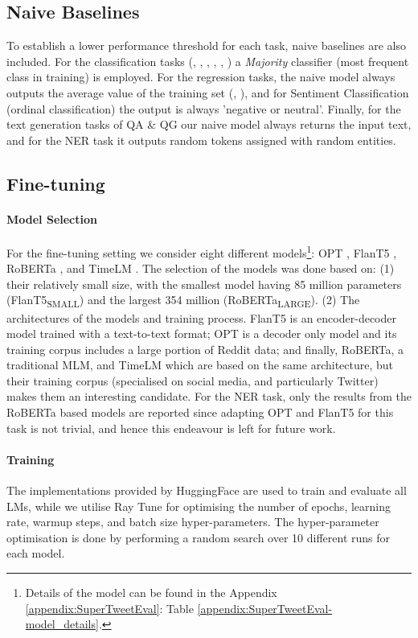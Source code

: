 \subsection{Naive Baselines}
To establish a lower performance threshold for each task, naive baselines are also included. For the classification tasks ({\TweetEmotion}, {\TweetNERD}, {\TempoWiC}, {\TweetTopic}, {\TweetHate}, {\TweetEmoji}) a \textit{Majority} classifier (most frequent class in training) is employed. For the regression tasks, the naive model always outputs the average value of the training set  ({\TweetIntimacy}, {\TweetSimilarity}), and for Sentiment Classification (ordinal classification) the output is always 'negative or neutral’. Finally, for the text generation tasks of QA \& QG our naive model always returns the input text, and for the NER task it outputs random tokens assigned with random entities.


\subsection{Fine-tuning}
\paragraph{Model Selection} For the fine-tuning setting we consider eight different models\footnote{Details of the model can be found in the Appendix \ref{appendix:SuperTweetEval}: Table \ref{appendix:SuperTweetEval-model_details}.}: OPT \cite{OPT}, FlanT5 \cite{chung2024scaling}, RoBERTa \cite{ROBERTA}, and TimeLM \cite{loureiro-etal-2022-timelms}. The selection of the models was done based on: (1) their relatively small size, with the smallest model having 85 million parameters (FlanT5\textsubscript{SMALL}) and the largest 354 million (RoBERTa\textsubscript{LARGE}). (2) The architectures of the models and training process. FlanT5 is an encoder-decoder model trained with a text-to-text format; OPT is a decoder only model and its training corpus includes a large portion of Reddit data; and finally, RoBERTa, a traditional \ac{MLM}, and TimeLM which are based on the same architecture, but their training corpus (specialised on social media, and particularly Twitter) makes them an interesting candidate. For the NER task, only the results from the RoBERTa based models are reported since adapting OPT and FlanT5 for this task is not trivial, and hence this endeavour is left for future work.

\paragraph{Training}  The implementations provided by HuggingFace \cite{wolf-etal-2020-transformers} are used to train and evaluate all \acp{LM}, while we utilise Ray Tune \cite{liaw2018tune} for optimising the number of epochs, learning rate, warmup steps, and batch size hyper-parameters. The hyper-parameter optimisation is done by performing a random search over 10 different runs for each model.


